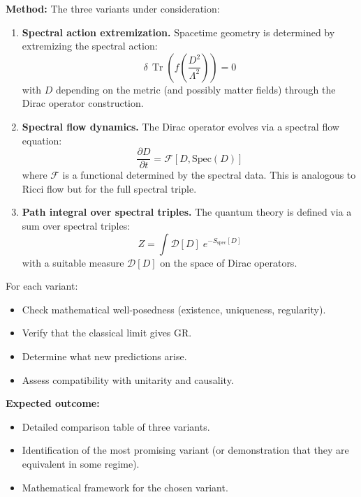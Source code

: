 \documentclass[12pt,a4paper]{article}
\newcommand{\Tr}{\operatorname{Tr}}
\newcommand{\Lam}{\Lambda}
\newcommand{\method}[1]{\noindent\textbf{Method:} #1\par}
\newcommand{\outcome}[1]{\noindent\textbf{Expected outcome:} #1\par}
\begin{document}
\method{
The three variants under consideration:
\begin{enumerate}[(V1)]
  \item \textbf{Spectral action extremization.}
    Spacetime geometry is determined by extremizing the spectral action:
    \begin{equation}
      \delta\, \Tr\!\left(f\!\left(\frac{D^2}{\Lam^2}\right)\right) = 0
    \end{equation}
    with $D$ depending on the metric (and possibly matter fields) through the
    Dirac operator construction.

  \item \textbf{Spectral flow dynamics.}
    The Dirac operator evolves via a spectral flow equation:
    \begin{equation}
      \frac{\partial D}{\partial t} = \mathcal{F}[D, \text{Spec}(D)]
    \end{equation}
    where $\mathcal{F}$ is a functional determined by the spectral data.
    This is analogous to Ricci flow but for the full spectral triple.

  \item \textbf{Path integral over spectral triples.}
    The quantum theory is defined via a sum over spectral triples:
    \begin{equation}
      Z = \int \mathcal{D}[D]\; e^{-S_{\text{spec}}[D]}
    \end{equation}
    with a suitable measure $\mathcal{D}[D]$ on the space of Dirac operators.
\end{enumerate}

For each variant:
\begin{itemize}
  \item Check mathematical well-posedness (existence, uniqueness, regularity).
  \item Verify that the classical limit gives GR.
  \item Determine what new predictions arise.
  \item Assess compatibility with unitarity and causality.
\end{itemize}
}

\outcome{
\begin{itemize}
  \item Detailed comparison table of three variants.
  \item Identification of the most promising variant (or demonstration that
    they are equivalent in some regime).
  \item Mathematical framework for the chosen variant.
\end{itemize}
}
\end{document}

